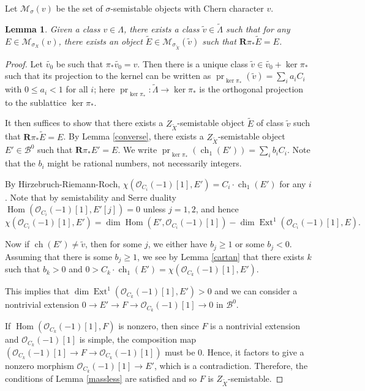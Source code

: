 \documentclass[12pt]{amsart}
\newtheorem{lemma}[theorem]{Lemma}
\theoremstyle{definition}
\DeclareMathOperator{\Hom}{Hom}
\DeclareMathOperator{\Ext}{Ext}
\DeclareMathOperator{\ch}{ch}
\DeclareMathOperator{\pr}{pr}
\begin{document}
Let $\mathcal{M}_{\sigma}(v)$ be the set of $\sigma$-semistable objects with Chern character $v$.
\begin{lemma}\label{widetildev}
Given a class $v \in \Lambda$, there exists a class $\widetilde{v} \in \widetilde{\Lambda}$ such that
for any $E \in \mathcal{M}_{\sigma_X}(v)$, 
there exists an object $\widetilde{E} \in \mathcal{M}_{\sigma_{\widetilde{X}}}(\widetilde{v})$ such that $\mathbf{R}\pi_\ast \widetilde{E}=E$.
\end{lemma}
\begin{proof}
Let $\widetilde{v_0}$ be such that $\pi_\ast \widetilde{v_0} =v$.
Then there is a unique class $\widetilde{v} \in \widetilde{v_0}+\ker \pi_\ast$ such that its projection to the kernel can be written as $\displaystyle \pr_{\ker \pi_\ast}(\widetilde{v}) = \sum_i a_i C_i$ with $0\leq a_i <1$ for all $i$;
here $\pr_{\ker \pi_\ast}\colon \widetilde{\Lambda} \longrightarrow \ker \pi_\ast$ is the orthogonal projection to the sublattice $\ker \pi_\ast$.

It then suffices to show that there exists a $Z_{\widetilde{X}}$-semistable object $\widetilde{E}$ of class $\widetilde{v}$ such that $\mathbf{R}\pi_\ast \widetilde{E}=E$.
By Lemma \ref{converse}, there exists a $Z_{\widetilde{X}}$-semistable object $E' \in \mathcal{B}^0$ such that $\mathbf{R}\pi_\ast E'=E$.
We write $\displaystyle \pr_{\ker \pi_\ast}(\ch_1(E')) = \sum_i b_i C_i$.
Note that the $b_i$ might be rational numbers, not necessarily integers.

By Hirzebruch-Riemann-Roch, $\chi(\mathcal{O}_{C_i}(-1)[1],E')= C_i\cdot \ch_1(E')$ for any $i$.
Note that by semistability and Serre duality $\Hom(\mathcal{O}_{C_i}(-1)[1],E'[j]) = 0$ unless $j=1,2$,
and hence  $$\chi(\mathcal{O}_{C_i}(-1)[1],E')= \dim \Hom(E',\mathcal{O}_{C_i}(-1)[1]) - \dim \Ext^1(\mathcal{O}_{C_i}(-1)[1], E).$$


Now if $\ch(E') \neq \widetilde{v}$, then for some $j$, we either have $b_j \geq 1$ or some $b_j < 0$.
Assuming that there is some $b_j \geq 1$, 
we see by Lemma \ref{cartan} that there exists $k$ such that $b_k > 0$ and $0 > C_k \cdot \ch_1(E')=\chi(\mathcal{O}_{C_k}(-1)[1],E')$.

This implies that $\dim \Ext^1(\mathcal{O}_{C_k}(-1)[1],E')>0$ and we can consider a nontrivial extension  $0 \longrightarrow E' \longrightarrow F \longrightarrow \mathcal{O}_{C_k}(-1)[1] \longrightarrow 0$ in $\mathcal{B}^0$.

If $\Hom(\mathcal{O}_{C_k}(-1)[1], F)$ is nonzero,
then since $F$ is a nontrivial extension and $\mathcal{O}_{C_k}(-1)[1]$ is simple,
the composition map $(\mathcal{O}_{C_k}(-1)[1] \longrightarrow F \longrightarrow \mathcal{O}_{C_k}(-1)[1])$ must be $0$.
Hence, it factors to give a nonzero morphism $\mathcal{O}_{C_k}(-1)[1] \longrightarrow E'$, which is a contradiction.
Therefore, the conditions of Lemma \ref{massless} are satisfied and so $F$ is $Z_{\widetilde{X}}$-semistable.


\end{proof}
\end{document}
